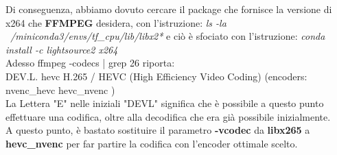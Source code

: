 Di conseguenza, abbiamo dovuto cercare il package che fornisce la versione di x264 che \textbf{FFMPEG} desidera, con l'istruzione: \emph{ls -la ~/miniconda3/envs/tf\_cpu/lib/libx2*} e ciò è sfociato con l'istruzione: \emph{conda install -c lightsource2 x264}\\
Adesso ffmpeg -codecs | grep 26 riporta:\\
 DEV.L. hevc H.265 / HEVC (High Efficiency Video Coding)  (encoders: nvenc\_hevc hevc\_nvenc )
\\La Lettera "E" nelle iniziali "DEVL" significa che è possibile a questo punto effettuare una codifica, oltre alla decodifica che era già possibile inizialmente.\\
 A questo punto, è bastato sostituire il parametro \textbf{-vcodec} da \textbf{libx265} a \textbf{hevc\_nvenc} per far partire la codifica con l'encoder ottimale scelto.

